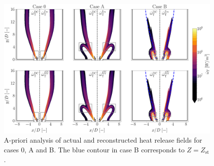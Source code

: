 \documentclass[preprint,12pt,authoryear]{elsarticle}
\begin{document}
{%



\begin{figure}[h!]
    \hspace{-0.5in}
	\includegraphics[scale=0.25]{./figures/FR_maps_a_priori_HRR}
	\caption{A-priori analysis of actual and reconstructed heat release fields for cases 0, A and B. The blue contour in case B corresponds to $Z = Z_\mathrm{st}$.}
	\label{fig:FR_maps_a_priori_HRR}
\end{figure}


}
\end{document}
